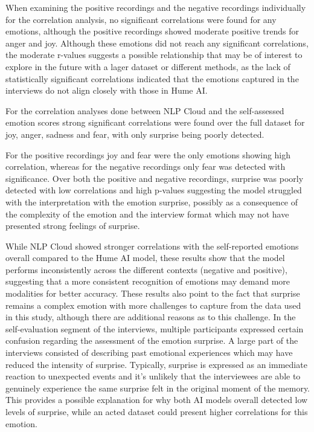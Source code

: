 When examining the positive recordings and the negative recordings individually for the correlation analysis, no significant correlations were found for any emotions, although the positive recordings showed moderate positive trends for anger and joy. Although these emotions did not reach any significant correlations, the moderate r-values suggests a possible relationship that may be of interest to explore in the future with a lager dataset or different methods, as the lack of statistically significant correlations indicated that the emotions captured in the interviews do not align closely with those in Hume AI. 

For the correlation analyses done between NLP Cloud and the self-assessed emotion scores strong significant correlations were found over the full dataset for joy, anger, sadness and fear, with only surprise being poorly detected.

For the positive recordings joy and fear were the only emotions showing high correlation, whereas for the negative recordings only fear was detected with significance. Over both the positive and negative recordings, surprise was poorly detected with low correlations and high p-values suggesting the model struggled with the interpretation with the emotion surprise, possibly as a consequence of the complexity of the emotion and the interview format which may not have presented strong feelings of surprise.

While NLP Cloud showed stronger correlations with the self-reported emotions overall compared to the Hume AI model, these results show that the model performs inconsistently across the different contexts (negative and positive), suggesting that a more consistent recognition of emotions may demand more modalities for better accuracy. These results also point to the fact that surprise remains a complex emotion with more challenges to capture from the data used in this study, although there are additional reasons as to this challenge. In the self-evaluation segment of the interviews, multiple participants expressed certain confusion regarding the assessment of the emotion surprise. A large part of the interviews consisted of describing past emotional experiences which may have reduced the intensity of surprise. Typically, surprise is expressed as an immediate reaction to unexpected events and it’s unlikely that the interviewees are able to genuinely experience the same surprise felt in the original moment of the memory. This provides a possible explanation for why both AI models overall detected low levels of surprise, while an acted dataset could present higher correlations for this emotion.

